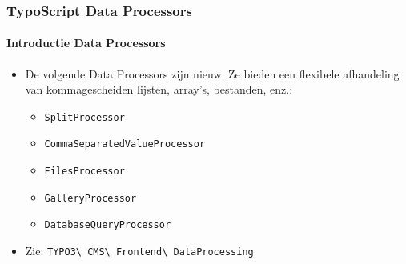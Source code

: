 \begin{frame}[fragile]
	\frametitle{TypoScript Data Processors}
	\framesubtitle{Introductie Data Processors}

	\lstset{basicstyle=\tiny\ttfamily}

	\begin{itemize}

		\item De volgende Data Processors zijn nieuw. Ze bieden een flexibele afhandeling van kommagescheiden lijsten, array's, bestanden, enz.:

			\begin{itemize}
				\item \texttt{SplitProcessor}
				\item \texttt{CommaSeparatedValueProcessor}
				\item \texttt{FilesProcessor}
				\item \texttt{GalleryProcessor}
				\item \texttt{DatabaseQueryProcessor}
			\end{itemize}

		\item Zie:
			\texttt{TYPO3\textbackslash
				CMS\textbackslash
				Frontend\textbackslash
				DataProcessing}

	\end{itemize}

\end{frame}


